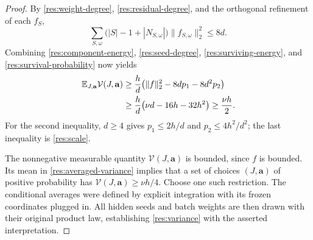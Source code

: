 \begin{proof}
By \eqref{res:weight-degree}, \eqref{res:residual-degree}, and the
orthogonal refinement of each \(f_S\),
\[
 \sum_{S,\omega}\bigl(|S|-1+|N_{S,\omega}|\bigr)
             \|f_{S,\omega}\|_2^2\leq8d.
\]
Combining \eqref{res:component-energy}, \eqref{res:seed-degree},
\eqref{res:surviving-energy}, and \eqref{res:survival-probability}
now yields
\begin{align}
 \mathbb E_{J,\mathbf a}\mathcal V(J,\mathbf a)
   &\geq\frac hd\bigl(\|f\|_2^2-8dp_1-8d^2p_2\bigr)\notag\\
   &\geq\frac hd\bigl(\nu d-16h-32h^2\bigr)
    \geq\frac{\nu h}{2}.\label{res:averaged-variance}
\end{align}
For the second inequality, \(d\geq4\) gives
\(p_1\leq2h/d\) and \(p_2\leq4h^2/d^2\); the last inequality
is \eqref{res:scale}.

The nonnegative measurable quantity \(\mathcal V(J,\mathbf a)\) is
bounded, since \(f\) is bounded.  Its mean in
\eqref{res:averaged-variance} implies that a set of choices
\((J,\mathbf a)\) of positive probability has
\(\mathcal V(J,\mathbf a)\geq\nu h/4\).  Choose one such restriction.
The conditional averages were defined by explicit integration with its
frozen coordinates plugged in.  All hidden seeds and batch weights are
then drawn with their original product law, establishing
\eqref{res:variance} with the asserted interpretation.
\end{proof}
